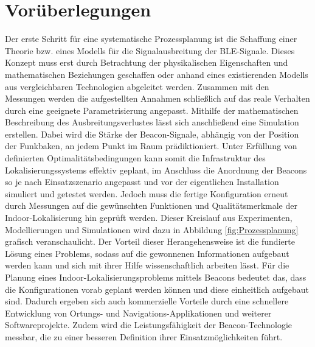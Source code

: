 \section{Vorüberlegungen}
Der erste Schritt für eine systematische Prozessplanung ist die Schaffung einer Theorie bzw. eines Modells für die Signalausbreitung der BLE-Signale. Dieses Konzept muss erst durch Betrachtung der physikalischen Eigenschaften und mathematischen Beziehungen geschaffen oder anhand eines existierenden Modells aus vergleichbaren Technologien abgeleitet werden. Zusammen mit den Messungen werden die aufgestellten Annahmen schließlich auf das reale Verhalten durch eine geeignete Parametrisierung angepasst. Mithilfe der mathematischen Beschreibung des Ausbreitungsverlustes lässt sich anschließend eine Simulation erstellen. Dabei wird die Stärke der Beacon-Signale, abhängig von der Position der Funkbaken, an jedem Punkt im Raum prädiktioniert. Unter Erfüllung von definierten Optimalitätsbedingungen kann somit die Infrastruktur des Lokalisierungssystems effektiv geplant, im Anschluss die Anordnung der Beacons so je nach Einsatzszenario angepasst und vor der eigentlichen Installation simuliert und getestet werden. Jedoch muss die fertige Konfiguration erneut durch Messungen auf die gewünschten Funktionen und Qualitätsmerkmale der Indoor-Lokalisierung hin geprüft werden. Dieser Kreislauf aus Experimenten, Modellierungen und Simulationen wird dazu in Abbildung \ref{fig:Prozessplanung} grafisch veranschaulicht. Der Vorteil dieser Herangehensweise ist die fundierte Lösung eines Problems, sodass auf die gewonnenen Informationen aufgebaut werden kann und sich mit ihrer Hilfe wissenschaftlich arbeiten lässt. Für die Planung eines Indoor-Lokalisierungsproblems mittels Beacons bedeutet das, dass die Konfigurationen vorab geplant werden können und diese einheitlich aufgebaut sind. Dadurch ergeben sich auch kommerzielle Vorteile durch eine schnellere Entwicklung von Ortungs- und Navigations-Applikationen und weiterer Softwareprojekte. Zudem wird die Leistungsfähigkeit der Beacon-Technologie messbar, die zu einer besseren Definition ihrer Einsatzmöglichkeiten führt.
